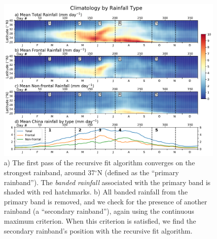 \documentclass[singlecolumn,11pt]{pnas-new}
\begin{document}
\begin{figure}[htbp]
\centering
\noindent\includegraphics[width=39pc]{Figures/hov_types_climo}
\caption{a) The first pass of the recursive fit algorithm converges on the strongest rainband, around 37$^{\circ}$N (defined as the ``primary rainband''). The \textit{banded rainfall} associated with the primary band is shaded with red hatchmarks. b) All banded rainfall from the primary band is removed, and we check for the presence of another rainband (a ``secondary rainband''), again using the continuous maximum criterion. When this criterion is satisfied, we find the secondary rainband's position with the recursive fit algorithm.}
\label{fig:algo_4}
\end{figure}
\end{document}
